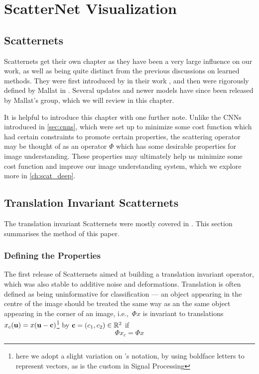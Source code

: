 \chapter{ScatterNet Visualization}\label{ch:vis}
\section{Scatternets}\label{ch:scatternets}

  Scatternets get their own chapter as they have been a very large influence on
  our work, as well as being quite distinct from the previous discussions on
  learned methods. They were first introduced by  
  \citeauthor{bruna_classification_2011} in their work 
  \citep{bruna_classification_2011}, and then were rigorously defined by Mallat
  in \citep{mallat_group_2012}. Several updates and newer models have since
  been released by Mallat's group, which we will review in this chapter.
  
  It is helpful to introduce this chapter with one further note. Unlike the
  CNNs introduced in \autoref{sec:cnns}, which were set up to minimize some
  cost function which had certain constraints to promote certain properties,
  the scattering operator may be thought of as an operator $\Phi$ which has
  some desirable properties for image understanding. These properties may
  ultimately help us minimize some cost function and improve our image
  understanding system, which we explore more in
  \autoref{ch:scat_deep}.


  \section{Translation Invariant Scatternets}
  The translation invariant Scatternets were mostly covered in
  \citep{bruna_invariant_2013}. This section summarises the method of this
  paper.

  \subsection{Defining the Properties}
  The first release of Scatternets aimed at building a translation invariant
  operator, which was also stable to additive noise and deformations. Translation
  is often defined as being uninformative for classification --- an object
  appearing in the centre of the image should be treated the same way as an
  the same object appearing in the corner of an image, i.e.,\ $\Phi x$ is
  invariant to translations $x_c(\mathbf{u}) = x(\mathbf{u}-\mathbf{c})$\footnote{here
  we adopt a slight variation on \Bruna's notation, by using boldface letters to
  represent vectors, as is the custom in Signal Processing} by 
  $\mathbf{c}=(c_1,c_2) \in \mathbb{R}^2$ if
  \begin{equation}\label{eq:scat_trans_invariance}
    \Phi x_c = \Phi x
  \end{equation}

